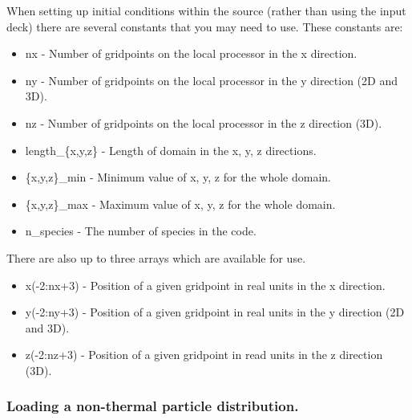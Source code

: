 \documentclass[12pt,a4paper]{article}
\newcommand{\EPOCH}{{\color{warwickdark}\fontfamily{phv}\selectfont{EPOCH}}}
\begin{document}
When setting up initial conditions within the {\EPOCH} source (rather than
using the input deck)
there are several constants that you may need to use. These constants are:
\begin{itemize}
\item nx - Number of gridpoints on the local processor in the x direction.
\item ny - Number of gridpoints on the local processor in the y direction (2D
  and 3D).
\item nz - Number of gridpoints on the local processor in the z direction (3D).
\item length\_\{x,y,z\} - Length of domain in the x, y, z directions.
\item \{x,y,z\}\_min - Minimum value of x, y, z for the whole domain.
\item \{x,y,z\}\_max - Maximum value of x, y, z for the whole domain.
\item n\_species - The number of species in the code.
\end{itemize}

There are also up to three arrays which are available for use.
\begin{itemize}
\item x(-2:nx+3) - Position of a given gridpoint in real units in the x
  direction.
\item y(-2:ny+3) - Position of a given gridpoint in real units in the y
  direction (2D and 3D).
\item z(-2:nz+3) - Position of a given gridpoint in read units in the z
  direction (3D).
\end{itemize}

\subsubsection{Loading a non-thermal particle distribution.}
\end{document}
